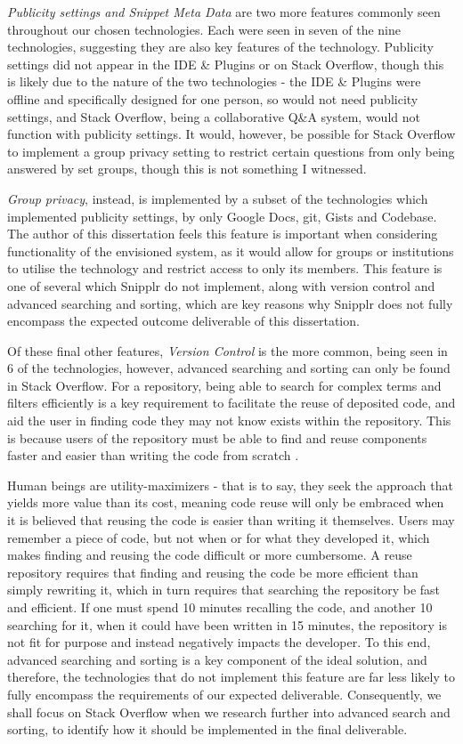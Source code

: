\textit{Publicity settings and Snippet Meta Data} are two more features commonly seen throughout our chosen technologies.
Each were seen in seven of the nine technologies, suggesting they are also key features of the technology.
Publicity settings did not appear in the IDE \& Plugins or on Stack Overflow, though this is likely due to the nature of the two technologies - the IDE \& Plugins were offline and specifically designed for one person, so would not need publicity settings, and Stack Overflow, being a collaborative Q\&A system, would not function with publicity settings.
It would, however, be possible for Stack Overflow to implement a group privacy setting to restrict certain questions from only being answered by set groups, though this is not something I witnessed.

\textit{Group privacy}, instead, is implemented by a subset of the technologies which implemented publicity settings, by only Google Docs, git, Gists and Codebase.
The author of this dissertation feels this feature is important when considering functionality of the envisioned system, as it would allow for groups or institutions to utilise the technology and restrict access to only its members.
This feature is one of several which Snipplr do not implement, along with version control and advanced searching and sorting, which are key reasons why Snipplr does not fully encompass the expected outcome deliverable of this dissertation.

Of these final other features, \textit{Version Control} is the more common, being seen in 6 of the technologies, however, advanced searching and sorting can only be found in Stack Overflow.
For a repository, being able to search for complex terms and filters efficiently is a key requirement to facilitate the reuse of deposited code, and aid the user in finding code they may not know exists within the repository.
This is because users of the repository must be able to find and reuse components faster and easier than writing the code from scratch \cite{Krueger1992}.

Human beings are utility-maximizers \cite{Cognition1997} - that is to say, they seek the approach that yields more value than its cost, meaning code reuse will only be embraced when it is believed that reusing the code is easier than writing it themselves.
Users may remember a piece of code, but not when or for what they developed it, which makes finding and reusing the code difficult or more cumbersome.
A reuse repository requires that finding and reusing the code be more efficient than simply rewriting it, which in turn requires that searching the repository be fast and efficient.
If one must spend 10 minutes recalling the code, and another 10 searching for it, when it could have been written in 15 minutes, the repository is not fit for purpose and instead negatively impacts the developer.
To this end, advanced searching and sorting is a key component of the ideal solution, and therefore, the technologies that do not implement this feature are far less likely to fully encompass the requirements of our expected deliverable.
Consequently, we shall focus on Stack Overflow when we research further into advanced search and sorting, to identify how it should be implemented in the final deliverable.

